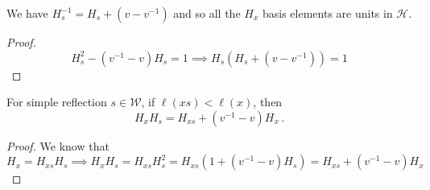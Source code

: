 \documentclass[11pt,leqno,oneside]{amsart}
\numberwithin{thm}{section}
\renewcommand{\W}{\mathcal{W}}
\renewcommand{\H}{\mathcal{H}} %
\begin{document}
\begin{lem}
  We have \(H_s^{-1} = H_s + (v-v^{-1})\) and so all the \(H_x\) basis
  elements are units in \(\H\).
\end{lem}
\begin{proof}
  \[
    H_s^2-(v^{-1}-v)H_s = 1 \implies H_s(H_s+(v-v^{-1})) = 1 
  \]
\end{proof}
\begin{lem}\label{lem:length-lowering-mult}
  For simple reflection \(s \in \W\), if \(\ell(xs) < \ell(x)\),
  then \[
    H_x H_s = H_{xs} + (v^{-1}-v)H_x \,. 
  \]
\end{lem}
\begin{proof}
  We know that \[
    H_x = H_{xs} H_s \implies H_x H_s = H_{xs} H_s^2 =
    H_{xs}(1+(v^{-1}-v)H_s) = H_{xs} + (v^{-1}-v)H_x
  \]
\end{proof}
\end{document}
